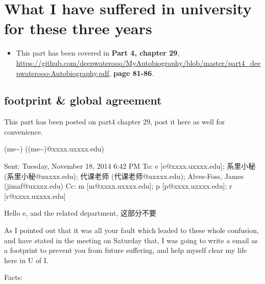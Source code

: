 \documentclass[9pt,b5paper]{article}
\begin{document}
\section{What I have suffered in university for these three years}
\label{sec-6}
\begin{itemize}
\item This part has been covered in \textbf{Part 4, chapter 29}, \url{https://github.com/deepwaterooo/MyAutobiography/blob/master/part4_deepwaterooo-Autobiography.pdf}, \textbf{page 81-86}.
\end{itemize}
\subsection{footprint \& global agreement}
\label{sec-6-1}
This part has been posted on part4 chapter 29, post it here as well for convenience. 

(me\textasciitilde{}) ((me\textasciitilde{})@xxxx.uxxxx.edu)

Sent:        Tuesday, November 18, 2014 6:42 PM
To:        
e [e@xxxx.uxxxx.edu]; 系里小秘 (系里小秘@uxxxx.edu); 代课老师 (代课老师@uxxxx.edu); Alves-Foss, James (jimaf@uxxxx.edu)
Cc:        
m [m@xxxx.uxxxx.edu]; p [p@xxxx.uxxxx.edu]; r [r@xxxx.uxxxx.edu]

Hello e, and the related department, 这部分不要

As I pointed out that it was all your fault which leaded to these whole confusion, and have stated in the meeting on Saturday that, I was going to write a email as a footprint to prevent you from future suffering, and help myself clear my life here in U of I. 

Facts:
\end{document}
